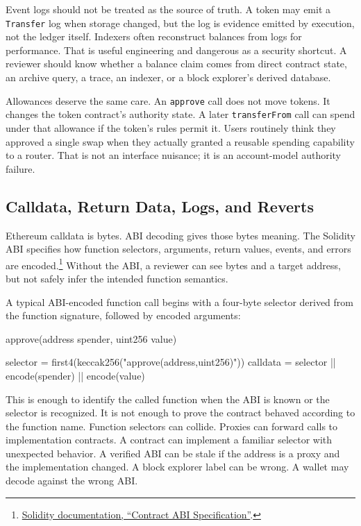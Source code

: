Event logs should not be treated as the source of truth. A token may emit a \texttt{Transfer} log when storage changed, but the log is evidence emitted by execution, not the ledger itself. Indexers often reconstruct balances from logs for performance. That is useful engineering and dangerous as a security shortcut. A reviewer should know whether a balance claim comes from direct contract state, an archive query, a trace, an indexer, or a block explorer's derived database.

Allowances deserve the same care. An \texttt{approve} call does not move tokens. It changes the token contract's authority state. A later \texttt{transferFrom} call can spend under that allowance if the token's rules permit it. Users routinely think they approved a single swap when they actually granted a reusable spending capability to a router. That is not an interface nuisance; it is an account-model authority failure.

\subsection{Calldata, Return Data, Logs, and Reverts}

Ethereum calldata is bytes. ABI decoding gives those bytes meaning. The Solidity ABI specifies how function selectors, arguments, return values, events, and errors are encoded.\footnote{\href{https://docs.soliditylang.org/en/latest/abi-spec.html}{Solidity documentation, ``Contract ABI Specification''}.} Without the ABI, a reviewer can see bytes and a target address, but not safely infer the intended function semantics.

A typical ABI-encoded function call begins with a four-byte selector derived from the function signature, followed by encoded arguments:

\begin{codeblock}
approve(address spender, uint256 value)

selector = first4(keccak256("approve(address,uint256)"))
calldata = selector || encode(spender) || encode(value)
\end{codeblock}

This is enough to identify the called function when the ABI is known or the selector is recognized. It is not enough to prove the contract behaved according to the function name. Function selectors can collide. Proxies can forward calls to implementation contracts. A contract can implement a familiar selector with unexpected behavior. A verified ABI can be stale if the address is a proxy and the implementation changed. A block explorer label can be wrong. A wallet may decode against the wrong ABI.

